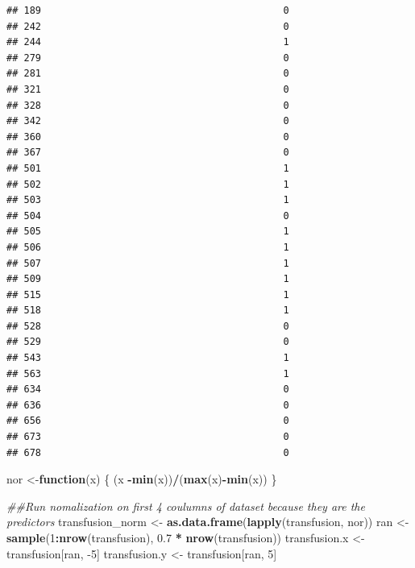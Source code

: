 \documentclass[
]{article}
\newenvironment{Shaded}{\begin{snugshade}}{\end{snugshade}}
\newcommand{\CommentTok}[1]{\textcolor[rgb]{0.56,0.35,0.01}{\textit{#1}}}
\newcommand{\ControlFlowTok}[1]{\textcolor[rgb]{0.13,0.29,0.53}{\textbf{#1}}}
\newcommand{\DecValTok}[1]{\textcolor[rgb]{0.00,0.00,0.81}{#1}}
\newcommand{\FloatTok}[1]{\textcolor[rgb]{0.00,0.00,0.81}{#1}}
\newcommand{\KeywordTok}[1]{\textcolor[rgb]{0.13,0.29,0.53}{\textbf{#1}}}
\newcommand{\NormalTok}[1]{#1}
\newcommand{\OperatorTok}[1]{\textcolor[rgb]{0.81,0.36,0.00}{\textbf{#1}}}
\newcommand{\StringTok}[1]{\textcolor[rgb]{0.31,0.60,0.02}{#1}}
\begin{document}
\begin{verbatim}
## 189                                          0
## 242                                          0
## 244                                          1
## 279                                          0
## 281                                          0
## 321                                          0
## 328                                          0
## 342                                          0
## 360                                          0
## 367                                          0
## 501                                          1
## 502                                          1
## 503                                          1
## 504                                          0
## 505                                          1
## 506                                          1
## 507                                          1
## 509                                          1
## 515                                          1
## 518                                          1
## 528                                          0
## 529                                          0
## 543                                          1
## 563                                          1
## 634                                          0
## 636                                          0
## 656                                          0
## 673                                          0
## 678                                          0
\end{verbatim}

\begin{Shaded}
\end{Shaded}

\begin{Shaded}
\begin{Highlighting}[]
\NormalTok{ nor <-}\ControlFlowTok{function}\NormalTok{(x) \{ (x }\OperatorTok{-}\KeywordTok{min}\NormalTok{(x))}\OperatorTok{/}\NormalTok{(}\KeywordTok{max}\NormalTok{(x)}\OperatorTok{-}\KeywordTok{min}\NormalTok{(x))   \}}
 
 \CommentTok{##Run nomalization on first 4 coulumns of dataset because they are the predictors}
\NormalTok{ transfusion_norm <-}\StringTok{ }\KeywordTok{as.data.frame}\NormalTok{(}\KeywordTok{lapply}\NormalTok{(transfusion, nor))}
\NormalTok{ran <-}\StringTok{ }\KeywordTok{sample}\NormalTok{(}\DecValTok{1}\OperatorTok{:}\KeywordTok{nrow}\NormalTok{(transfusion), }\FloatTok{0.7} \OperatorTok{*}\StringTok{ }\KeywordTok{nrow}\NormalTok{(transfusion)) }
\NormalTok{transfusion.x <-}\StringTok{ }\NormalTok{transfusion[ran, }\DecValTok{-5}\NormalTok{]}
\NormalTok{transfusion.y <-}\StringTok{ }\NormalTok{transfusion[ran, }\DecValTok{5}\NormalTok{]}
\end{Highlighting}
\end{Shaded}
\end{document}
